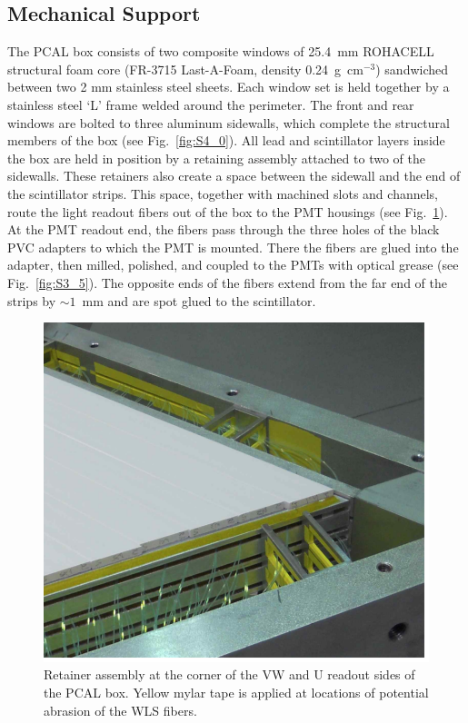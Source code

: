 \subsection{Mechanical Support}

The PCAL box consists of two composite windows of 25.4~mm ROHACELL structural foam core (FR-3715
Last-A-Foam, density 0.24~g~cm$^{-3}$) sandwiched between two 2 mm stainless steel sheets. Each window
set is held together by a stainless steel `L' frame welded around the perimeter. The front and rear windows
are bolted to three aluminum sidewalls, which complete the structural members of the box (see
Fig.~\ref{fig:S4_0}). All lead and scintillator layers inside the box are held in position by a retaining assembly
attached to two of the sidewalls. These retainers also create a space between the sidewall and the end of the
scintillator strips. This space, together with machined slots and channels, route the light readout fibers out of
the box to the PMT housings (see Fig.~\ref{fig:S3_6}).  At the PMT readout end, the fibers pass through the
three holes of the black PVC adapters to which the PMT is mounted.  There the fibers are glued into the adapter,
then milled, polished, and coupled to the PMTs with optical grease (see Fig.~\ref{fig:S3_5}). The opposite ends
of the fibers extend from the far end of the strips by $\sim 1$~mm and are spot glued to the scintillator.  

\begin{figure}[hbt]
\centering
\includegraphics[width=0.95\columnwidth,keepaspectratio]{img/S3_6.png}
\caption[PCAL UVW Layers]{Retainer assembly at the corner of the VW and U readout sides of the PCAL box.
  Yellow mylar tape is applied at locations of potential abrasion of the WLS fibers.}
\label{fig:S3_6}
\end{figure}

